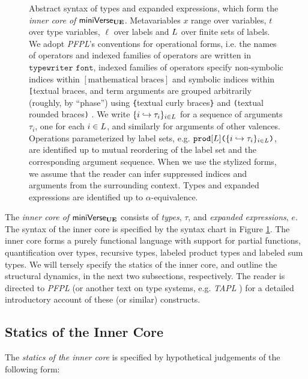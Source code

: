 \begin{figure}
\caption[Syntax of types and expanded expressions in $\miniVerseUE$]{Abstract syntax of types and expanded expressions, which form the \emph{inner core of }$\miniVerseUE$. Metavariables $x$ range over variables, $t$ over type variables, $\ell$ over labels and $L$ over finite sets of labels. We adopt \emph{PFPL}'s conventions for operational forms, i.e. the names of operators and indexed families of operators are written in $\texttt{typewriter font}$, indexed families of operators specify non-symbolic indices within $[\text{mathematical braces}]$ and symbolic indices within \texttt{[}textual braces\text{]}, and term arguments are grouped arbitrarily (roughly, by ``phase'') using \texttt{\{}textual curly braces\texttt{\}} and \texttt{(}textual rounded braces\texttt{)} \cite{pfpl}. We write $\{i \hookrightarrow \tau_{i}\}_{i \in L}$ for a sequence of arguments $\tau_i$, one for each $i\in L$, and similarly for arguments of other valences. Operations  parameterized by label sets, e.g. $\texttt{prod}[L]\texttt{(}\{i \hookrightarrow \tau_{i}\}_{i \in L}\texttt{)}$, are identified up to mutual reordering of the label set and the corresponding argument sequence. %
When we use the stylized forms, we assume that the reader can infer suppressed indices and arguments from the surrounding context. Types and expanded expressions are identified up to $\alpha$-equivalence.}
\label{fig:U-expanded-terms}
\end{figure}

The \emph{inner core of} $\miniVerseUE$ consists of \emph{types}, $\tau$, and \emph{expanded expressions}, $e$. The syntax of the inner core is specified by the syntax chart in Figure \ref{fig:U-expanded-terms}. 
The {inner core} forms a purely functional language with support for partial functions, quantification over types, recursive types, labeled product types and labeled sum types. We will tersely specify the statics of the inner core, and outline the structural dynamics, in the next two subsections, respectively. The reader is directed to \emph{PFPL} \cite{pfpl} (or another text on type systems, e.g. \emph{TAPL} \cite{tapl}) for a detailed introductory account of these (or similar) constructs.

\subsection{Statics of the Inner Core}
The \emph{statics of the inner core} is specified by hypothetical judgements of the following form:


